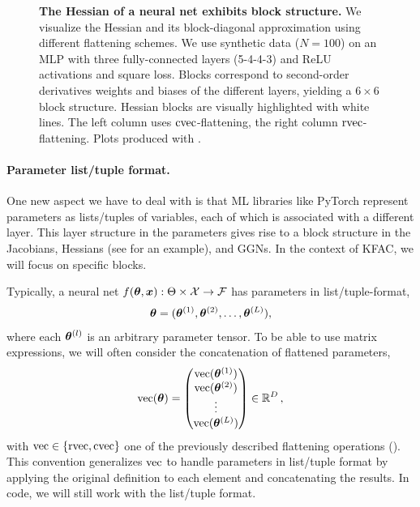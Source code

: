 \begin{figure}[!h]
\begin{minipage}[t]{0.495\linewidth}
  \end{minipage}
  \caption{\textbf{The Hessian of a neural net exhibits block structure.}
    We visualize the Hessian and its block-diagonal approximation using different flattening schemes.
    We use synthetic data ($N=100$) on an MLP with three fully-connected layers (5-4-4-3) and ReLU activations and square loss.
    Blocks correspond to second-order derivatives \wrt weights and biases of the different layers, yielding a $6 \times 6$ block structure.
    Hessian blocks are visually highlighted with white lines.
    The left column uses $\cvec$-flattening, the right column $\rvec$-flattening.
    Plots produced with .
  }\label{fig:hessian-block-structure}
\end{figure}
\switchcolumn[0]

\paragraph{Parameter list/tuple format.} One new aspect we have to deal with is that ML libraries like PyTorch represent parameters as lists/tuples of variables, each of which is associated with a different layer.
This layer structure in the parameters gives rise to a block structure in the Jacobians, Hessians (see  for an example), and GGNs.
In the context of KFAC, we will focus on specific blocks.

Typically, a neural net $f(\vtheta, \vx): \Theta \times \gX \to \gF$ has parameters in list/tuple-format,
\begin{align*}
  \vtheta = (\vtheta^{(1)}, \vtheta^{(2)}, \ldots, \vtheta^{(L)}),
\end{align*}
where each $\vtheta^{(l)}$ is an arbitrary parameter tensor.
To be able to use matrix expressions, we will often consider the concatenation of flattened parameters,
\begin{align*}
  \vec(\vtheta)
  =
  \begin{pmatrix}
    \vec(\vtheta^{(1)}) \\
    \vec(\vtheta^{(2)}) \\
    \vdots              \\
    \vec(\vtheta^{(L)})
  \end{pmatrix}
  \in \sR^D
  \,,
\end{align*}
with $\vec \in \{ \rvec, \cvec \}$ one of the previously described flattening operations ().
This convention generalizes $\vec$ to handle parameters in list/tuple format by applying the original definition to each element and concatenating the results.
In code, we will still work with the list/tuple format.

